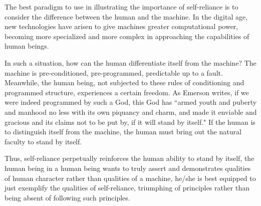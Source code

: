 \documentclass[12pt,letterpaper]{article}
\newif\ifdraft
\begin{document}
The best paradigm to use in illustrating the importance of self-reliance is to consider the difference between the human and the machine.  In the digital age, new technologies have arisen to give machines greater computational power, becoming more specialized and more complex in approaching the capabilities of human beings.

In such a situation,  how can the human differentiate itself from the machine?  The machine is pre-conditioned, pre-programmed, predictable up to a fault.  Meanwhile, the human being, not subjected to these rules of conditioning and programmed structure, experiences a certain freedom.  As Emerson writes, if we were indeed programmed by such a God, this God has ``armed youth and puberty and manhood no less with its own piquancy and charm, and made it enviable and gracious and its claims not to be put by, if it will stand by itself."  If the human is to distinguish itself from the machine, the human must bring out the natural faculty to stand by itself.

Thus, self-reliance perpetually reinforces the human ability to stand by itself, the human being in 
 a human being wants to truly assert and demonstrates qualities of human character rather than qualities of a machine, he/she is best equipped to just exemplify the qualities of self-reliance, triumphing of principles rather than being absent of following such principles.  


\ifdraft

while the human being is not.  Any attempts t understand the human being will result in possible misconception, where human beings are isolated and divorced from the realism that unfolds.

f the human being is to truly assert his/her human qualities over.  These qualities are qualities of self-reliance

Such computational power is not necessarily divorced from human realities but

For one, self-reliance is an important assertion.  Envy is ignorance and imitation is suicide, Emerson writes.  

Consider the argument that attempts to distinguish a robot from a human being.  For one thing, the human being is great

Self-reliance is important because it addresses the inherent necessity of producing the good works of human knowledge  

It is for this self-reliance that we motivate.  Without a desire to achieve self-reliance, the goals of this paper would be aimless.
\fi
\end{document}
